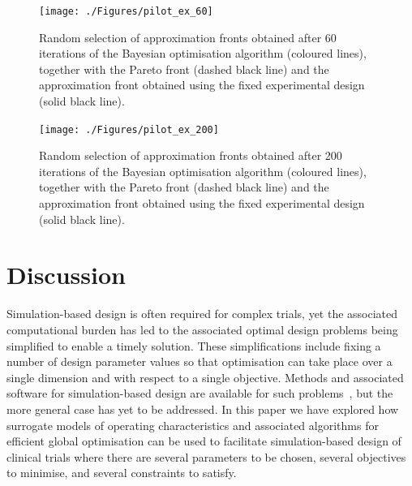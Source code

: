 \documentclass{article} %
\begin{document}
\begin{figure}
\centering
\texttt{[image: ./Figures/pilot\_ex\_60]}
\caption{Random selection of approximation fronts obtained after 60 iterations of the Bayesian optimisation algorithm (coloured lines), together with the Pareto front (dashed black line) and the approximation front obtained using the fixed experimental design (solid black line).}
\label{fig:pilot_ex_60}
\end{figure}

\begin{figure}
\centering
\texttt{[image: ./Figures/pilot\_ex\_200]}
\caption{Random selection of approximation fronts obtained after 200 iterations of the Bayesian optimisation algorithm (coloured lines), together with the Pareto front (dashed black line) and the approximation front obtained using the fixed experimental design (solid black line).}
\label{fig:pilot_ex_200}
\end{figure}


\section{Discussion}\label{sec:discussion}

Simulation-based design is often required for complex trials, yet the associated computational burden has led to the associated optimal design problems being simplified to enable a timely solution. These simplifications include fixing a number of design parameter values so that optimisation can take place over a single dimension and with respect to a single objective. Methods and associated software for simulation-based design are available for such problems~\cite{Landau2013, Hooper2013}, but the more general case has yet to be addressed. In this paper we have explored how surrogate models of operating characteristics and associated algorithms for efficient global optimisation can be used to facilitate simulation-based design of clinical trials where there are several parameters to be chosen, several objectives to minimise, and several constraints to satisfy.
\end{document}
